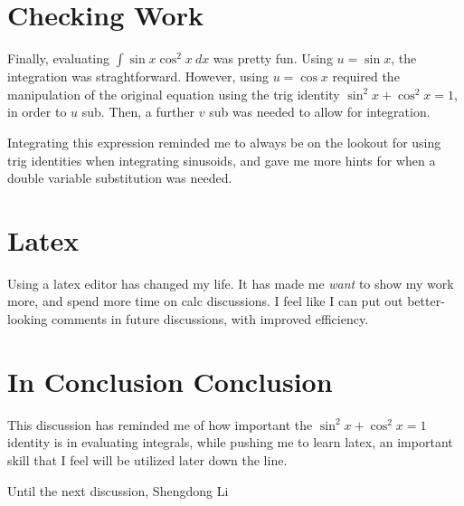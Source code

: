 \documentclass[letterpaper, 12pt]{article}
\begin{document}
\section{Checking Work}
Finally, evaluating $\int\sin x\cos^2x\:dx$ was pretty fun. Using $u=\sin x$, the integration was straghtforward. However, using $u=\cos x$ required the manipulation of the original equation using the trig identity $\sin^2x+\cos^2x=1$, in order to $u$ sub. Then, a further $v$ sub was needed to allow for integration. \par
Integrating this expression reminded me to always be on the lookout for using trig identities when integrating sinusoids, and gave me more hints for when a double variable substitution was needed.
\section{Latex}
Using a latex editor has changed my life. It has made me \textit{want} to show my work more, and spend more time on calc discussions. I feel like I can put out better-looking comments in future discussions, with improved efficiency.
\section{In Conclusion Conclusion}
This discussion has reminded me of how important the $\sin^2x+\cos^2x=1$ identity is in evaluating integrals, while pushing me to learn latex, an important skill that I feel will be utilized later down the line. \par
Until the next discussion,
Shengdong Li
\end{document}
